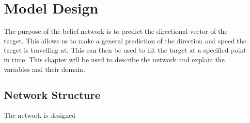 \chapter{Model Design}

The purpose of the belief network is to predict the directional vector of the
target. This allows us to make a general prediction of the direction and speed
the target is travelling at. This can then be used to hit the target at a
specified point in time. This chapter will be used to describe the network and
explain the variables and their domain.

\section{Network Structure}

The network is designed


